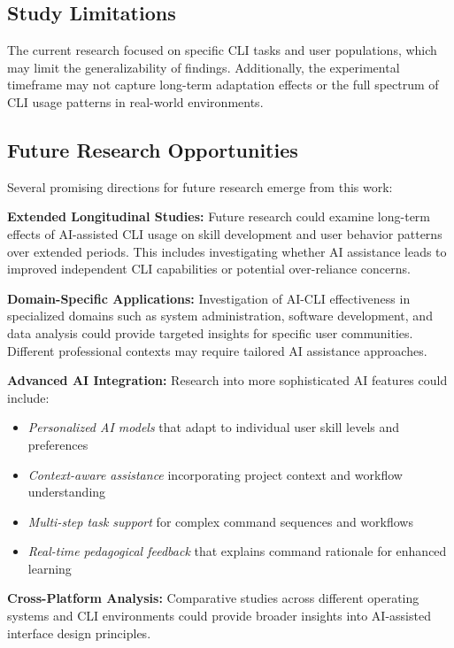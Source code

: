 \subsection{Study Limitations}

The current research focused on specific CLI tasks and user populations, which may limit the generalizability of findings. Additionally, the experimental timeframe may not capture long-term adaptation effects or the full spectrum of CLI usage patterns in real-world environments.

\subsection{Future Research Opportunities}

Several promising directions for future research emerge from this work:

\textbf{Extended Longitudinal Studies:}
Future research could examine long-term effects of AI-assisted CLI usage on skill development and user behavior patterns over extended periods. This includes investigating whether AI assistance leads to improved independent CLI capabilities or potential over-reliance concerns.

\textbf{Domain-Specific Applications:}
Investigation of AI-CLI effectiveness in specialized domains such as system administration, software development, and data analysis could provide targeted insights for specific user communities. Different professional contexts may require tailored AI assistance approaches.

\textbf{Advanced AI Integration:}
Research into more sophisticated AI features could include:
\begin{itemize}
	\item \textit{Personalized AI models} that adapt to individual user skill levels and preferences
	\item \textit{Context-aware assistance} incorporating project context and workflow understanding
	\item \textit{Multi-step task support} for complex command sequences and workflows
	\item \textit{Real-time pedagogical feedback} that explains command rationale for enhanced learning
\end{itemize}

\textbf{Cross-Platform Analysis:}
Comparative studies across different operating systems and CLI environments could provide broader insights into AI-assisted interface design principles.

